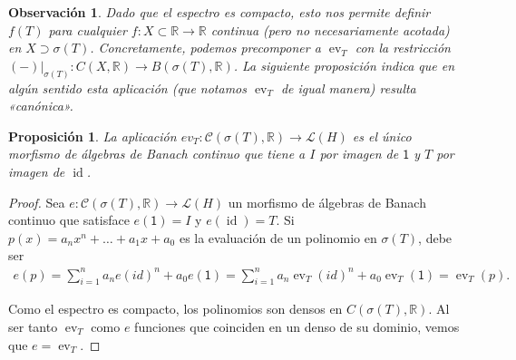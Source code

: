 \documentclass[11pt]{report}
\theoremstyle{colored}
\newtheorem{proposition}{Proposición}[section]
\newtheorem{remark}{Observación}[section]
\newcommand{\R}{\mathbb{R}}
\newcommand{\ev}{\operatorname{ev}}
\newcommand{\id}{\operatorname{id}}
\begin{document}
\begin{remark} Dado que el espectro es compacto, esto nos permite definir $f(T)$ para cualquier $f : X \subset \R \to \R$ continua (pero no necesariamente acotada) en $X \supset \sigma(T)$. Concretamente,  podemos precomponer a $\ev_T$ con la restricción $(-)|_{\sigma(T)} : C(X, \R) \to B(\sigma(T), \R)$. La siguiente proposición indica que en algún sentido esta aplicación (que notamos $\ev_T$ de igual manera) resulta \textit{«canónica»}.
\end{remark}

\begin{proposition} La aplicación $ev_T : \mathcal{C}(\sigma(T),\R) \to \mathscr{L}(H)$ es el único morfismo de álgebras de Banach continuo que tiene a $I$ por imagen de $\mathsf{1}$ y $T$ por imagen de $\id$.
\end{proposition}
\begin{proof} Sea $e : \mathcal{C}(\sigma(T),\R) \to \mathscr{L}(H)$ un morfismo de álgebras de Banach continuo que satisface $e(\mathsf{1}) = I$ y $e(\id) = T$. Si $p (x)= a_nx^n + \dots + a_1x+ a_0$ es la evaluación de un polinomio en $\sigma(T)$, debe ser
\begin{align*}
e(p) = \sum_{i=1}^na_ne(id)^n + a_0e(\mathsf{1}) = \sum_{i=1}^na_n\ev_T(id)^n + a_0\ev_T(\mathsf{1}) = \ev_T(p).
\end{align*}

Como el espectro es compacto, los polinomios son densos en $C(\sigma(T),\R)$. Al ser tanto $\ev_T$ como $e$ funciones que coinciden en un denso de su dominio, vemos que $e = \ev_T$.
\end{proof}
\end{document}
